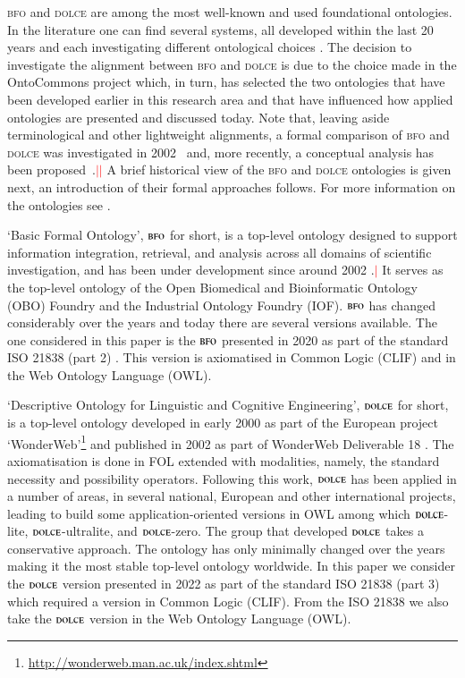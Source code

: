 \documentclass[ao]{iosart2x}
\newcommand{\nb}[1]{\textcolor{red}{$|$}\marginpar{\hspace*{-0cm}\parbox{20mm}{\scriptsize\raggedright\textcolor{red}{#1}}}}
\newcommand{\dolce}{{\textsc{dolce}}}
\newcommand{\bfo}{{\textsc{bfo}}}
\begin{document}
{\bfo} and {\dolce} are among the most well-known and used foundational ontologies. In the literature one can find several systems, all developed within the last 20 years and each investigating different ontological choices \citep{Borgo-GK2022FOinAction}.%
The decision to investigate the alignment between {\bfo} and {\dolce} is due to the choice made in the OntoCommons project which, in turn, has selected the two ontologies that have been developed earlier in this research area and that have influenced how applied ontologies are presented and discussed today. Note that, leaving aside terminological and other lightweight alignments, a formal comparison of {\bfo} and {\dolce} was investigated in 2002~\citep{D18,} and, more recently, a conceptual analysis has been proposed~\citep{Guarino-2017BfoDolce}.\nb{CM: (1) questo non è vero; (2) citare qui i lavori che esistono su questo inclusi quelli di Nicola?}\nb{SB: ho messo `comparison' e aggiunto Guarino. altro da correggere/aggiungere?}
A brief historical view of the {\bfo} and {\dolce} ontologies is given next, an introduction of their formal approaches follows. For more information on the ontologies see \citep{ISO21838, Borgo-GK2022FOinAction}.


`Basic Formal Ontology', $\bfo$ for short, is a top-level ontology designed to support information integration, retrieval, and analysis across all domains of scientific investigation, and has been under development since around 2002  \citep{grenonBiodynamic2004}.\nb{per bib vedi file .tex}
It serves as the top-level ontology of the Open Biomedical and Bioinformatic Ontology (OBO) Foundry and the Industrial Ontology Foundry (IOF). $\bfo$ has changed considerably over the years and today there are several versions available.
The one considered in this paper is the $\bfo$ presented in 2020 as part of the standard ISO 21838 (part 2) \citep{ISO21838}. This version is axiomatised in Common Logic (CLIF) \citep{ISO24707} and in the Web Ontology Language (OWL).


`Descriptive Ontology for Linguistic and Cognitive Engineering', $\dolce$ for short, is a top-level ontology developed in early 2000 as part of the European project `WonderWeb'\footnote{\url{http://wonderweb.man.ac.uk/index.shtml}} and published in 2002 as part of WonderWeb Deliverable 18 \citep{D18}. The axiomatisation is done in FOL extended with modalities, namely, the standard necessity and possibility operators. Following this work, $\dolce$ has been applied in a number of areas, in several national, European and other international projects, leading to build some application-oriented versions in OWL among which $\dolce$-lite, $\dolce$-ultralite, and $\dolce$-zero. 
The group that developed $\dolce$ takes a conservative approach. The ontology has only minimally changed over the years making it the most stable top-level ontology worldwide. In this paper we consider the $\dolce$ version presented in 2022 as part of the standard ISO 21838 (part 3) which required a version in Common Logic (CLIF). 
From the ISO 21838 we also take the $\dolce$ version in the Web Ontology Language (OWL).
\end{document}
